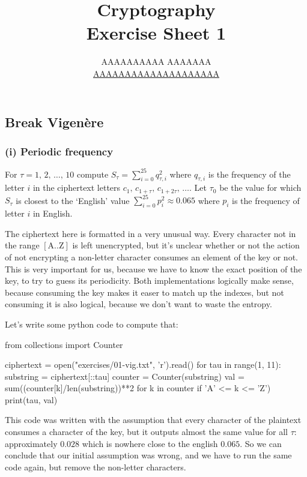 \documentclass{article}
\title{Cryptography \\ Exercise Sheet 1}
\author{
  AAAAAAAAAA AAAAAAA \\
  \href{mailto:AAAAAAAAAAAAAAAAAAAA}{AAAAAAAAAAAAAAAAAAAA}
}
\begin{document}
  \maketitle

  \setcounter{section}{1}
  \subsection{Break Vigenère}
  \subsubsection*{(i) Periodic frequency}
  \begin{centerframebox}
    For $\tau = 1,\, 2,\, \dots,\, 10$ compute $S_\tau = \sum_{i=0}^{25} q^2_{\tau,i}$
    where $q_{\tau,i}$ is the frequency of the letter $i$ in the ciphertext letters $c_1,\, c_{1+\tau},\, c_{1+2\tau},\, \dots$.
    Let $\tau_0$ be the value for which $S_\tau$ is closest to the `English' value $\sum_{i=0}^{25} p_i^2 \approx 0.065$
    where $p_i$ is the frequency of letter $i$ in English.
  \end{centerframebox}
  The ciphertext here is formatted in a very unusual way.
  Every character not in the range $[\text{A} .. \text{Z}]$ is left unencrypted,
  but it's unclear whether or not the action of not encrypting a non-letter character consumes an element of the key or not.
  This is very important for us, because we have to know the exact position of the key, to try to guess its periodicity.
  Both implementations logically make sense, because consuming the key makes it easer to match up the indexes,
  but not consuming it is also logical, because we don't want to waste the entropy.

  Let's write some python code to compute that:
  \begin{mylisting}
    from collections import Counter

    ciphertext = open("exercises/01-vig.txt", 'r').read()
    for tau in range(1, 11):
      substring = ciphertext[::tau]
      counter = Counter(substring)
      val = sum((counter[k]/len(substring))**2 for k in counter if 'A' <= k <= 'Z')
      print(tau, val)
  \end{mylisting}
  This code was written with the assumption that every character of the plaintext consumes a character of the key,
  but it outputs almost the same value for all $\tau$: approximately $0.028$ which is nowhere close to the english $0.065$.
  So we can conclude that our initial assumption was wrong, and we have to run the same code again, but remove the non-letter characters.
\end{document}
